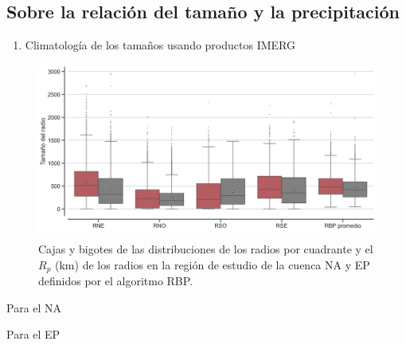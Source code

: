 \subsection{Sobre la relación del tamaño y la precipitación}
\begin{frame}
\begin{enumerate}
\setcounter{enumi}{0}
    \item Climatología de los tamaños usando productos IMERG
\end{enumerate}
    \begin{figure}
        \centering
        \includegraphics[scale = 0.3]{Images/Figures/Fig_3_13.jpeg}
        \caption{Cajas y bigotes de las distribuciones de los radios por cuadrante y el $R_p$ (km) de los radios en la región de estudio de la cuenca {\red NA} y {\gray EP} definidos por el algoritmo RBP.}
        \label{fig:fig_13}
    \end{figure}
\end{frame}

\begin{frame}
    \begin{exampleblock}{Para el NA}
        
    \end{exampleblock}
\end{frame}

\begin{frame}
    \begin{alertblock}{Para el EP}
        
    \end{alertblock}
\end{frame}

